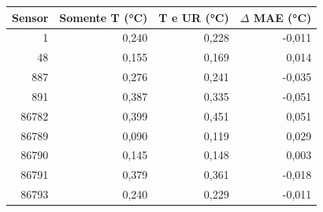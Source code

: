 \begin{tabular}{rrrr}
\toprule
Sensor & Somente T (°C) & T e UR (°C) & $\Delta$ MAE (°C) \\
\midrule
1 & 0,240 & 0,228 & -0,011 \\
48 & 0,155 & 0,169 & 0,014 \\
887 & 0,276 & 0,241 & -0,035 \\
891 & 0,387 & 0,335 & -0,051 \\
86782 & 0,399 & 0,451 & 0,051 \\
86789 & 0,090 & 0,119 & 0,029 \\
86790 & 0,145 & 0,148 & 0,003 \\
86791 & 0,379 & 0,361 & -0,018 \\
86793 & 0,240 & 0,229 & -0,011 \\
\bottomrule
\end{tabular}
